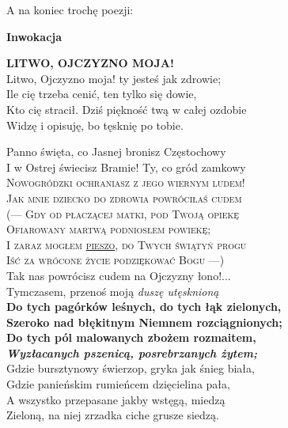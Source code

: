 A na koniec trochę poezji:


\begin{center}
    \textbf{Inwokacja}
\end{center}

\textbf{LITWO, OJCZYZNO MOJA!} \\
Litwo, Ojczyzno moja! ty jesteś jak zdrowie; \\
Ile cię trzeba cenić, ten tylko się dowie, \\
Kto cię stracił. Dziś piękność twą w całej ozdobie \\
Widzę i opisuję, bo tęsknię po tobie. 

Panno święta, co Jasnej bronisz Częstochowy \\
I w Ostrej świecisz Bramie! Ty, co gród zamkowy\\
\textsc{Nowogródzki ochraniasz z jego wiernym ludem!\\
Jak mnie dziecko do zdrowia powróciłaś cudem\\
(— Gdy od płaczącej matki, pod Twoją opiekę\\
Ofiarowany martwą podniosłem powiekę;\\
I zaraz mogłem \underline{pieszo}, do Twych świątyń progu\\
Iść za wrócone życie podziękować Bogu —)}\\
Tak nas powrócisz cudem na Ojczyzny łono!...\\
Tymczasem, przenoś moją \emph{duszę utęsknioną}\\
\textbf{Do tych pagórków leśnych, do tych łąk zielonych,\\
Szeroko nad błękitnym Niemnem rozciągnionych;\\
Do tych pól malowanych zbożem rozmaitem,}\\
\textbf{\textit{Wyzłacanych pszenicą, posrebrzanych żytem;}}\\
Gdzie bursztynowy świerzop, gryka jak śnieg biała,\\
Gdzie panieńskim rumieńcem dzięcielina pała,\\
A wszystko przepasane jakby wstęgą, miedzą\\
Zieloną, na niej zrzadka ciche grusze siedzą.\\
















